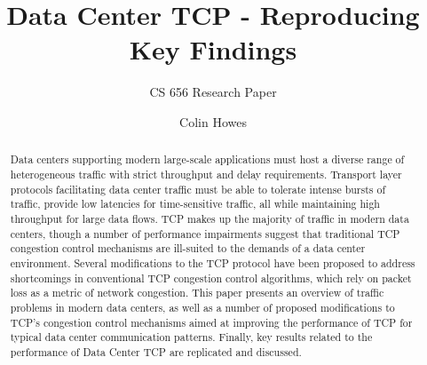 \documentclass[sigconf]{acmart}
\begin{document}
\title{Data Center TCP - Reproducing Key Findings}
\subtitle{CS 656 Research Paper}

\author{Colin Howes}

\begin{abstract}

Data centers supporting modern large-scale applications must host a diverse range of heterogeneous traffic with strict throughput and delay requirements. Transport layer protocols facilitating data center traffic must be able to tolerate intense bursts of traffic, provide low latencies for time-sensitive traffic, all while maintaining high throughput for large data flows. TCP makes up the majority of traffic in modern data centers, though a number of performance impairments suggest that traditional TCP congestion control mechanisms are ill-suited to the demands of a data center environment. Several modifications to the TCP protocol have been proposed to address shortcomings in conventional TCP congestion control algorithms, which rely on packet loss as a metric of network congestion. This paper presents an overview of traffic problems in modern data centers, as well as a number of proposed modifications to TCP's congestion control mechanisms aimed at improving the performance of TCP for typical data center communication patterns. Finally, key results related to the performance of Data Center TCP are replicated and discussed.

\end{abstract}

\maketitle




 
\end{document}
